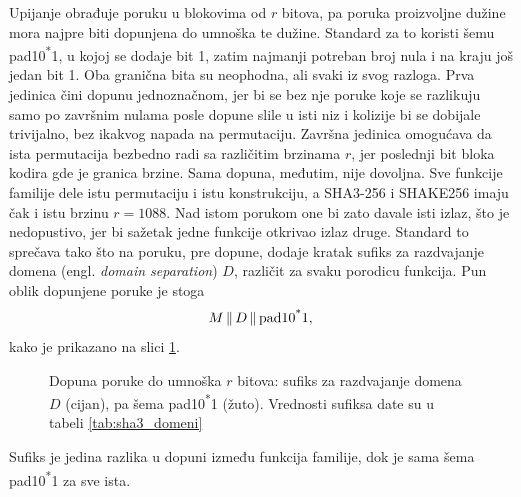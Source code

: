 Upijanje obrađuje poruku u blokovima od $r$ bitova, pa poruka proizvoljne dužine mora najpre biti dopunjena do umnoška te dužine. Standard za to koristi šemu pad10\textsuperscript{*}1, u kojoj se dodaje bit 1, zatim najmanji potreban broj nula i na kraju još jedan bit 1. Oba granična bita su neophodna, ali svaki iz svog razloga. Prva jedinica čini dopunu jednoznačnom, jer bi se bez nje poruke koje se razlikuju samo po završnim nulama posle dopune slile u isti niz i kolizije bi se dobijale trivijalno, bez ikakvog napada na permutaciju. Završna jedinica omogućava da ista permutacija bezbedno radi sa različitim brzinama $r$, jer poslednji bit bloka kodira gde je granica brzine.
\smallbreak
Sama dopuna, međutim, nije dovoljna. Sve funkcije familije dele istu permutaciju i istu konstrukciju, a SHA3-256 i SHAKE256 imaju čak i istu brzinu $r = 1088$. Nad istom porukom one bi zato davale isti izlaz, što je nedopustivo, jer bi sažetak jedne funkcije otkrivao izlaz druge. Standard to sprečava tako što na poruku, pre dopune, dodaje kratak sufiks za razdvajanje domena (engl. \textit{domain separation}) $D$, različit za svaku porodicu funkcija. Pun oblik dopunjene poruke je stoga
\begin{equation}
    M \,\|\, D \,\|\, \text{pad10\textsuperscript{*}1},
    \label{eq:sha3_dopuna}
\end{equation}
kako je prikazano na slici \ref{fig:pad101}.

\begin{figure}[H]
\centering
{}
\caption[Dopuna poruke u SHA-3 familiji]{Dopuna poruke do umnoška $r$ bitova: sufiks za razdvajanje domena $D$ (cijan), pa šema pad10\textsuperscript{*}1 (žuto). Vrednosti sufiksa date su u tabeli \ref{tab:sha3_domeni}}
\label{fig:pad101}
\end{figure}

Sufiks je jedina razlika u dopuni između funkcija familije, dok je sama šema pad10\textsuperscript{*}1 za sve ista.

